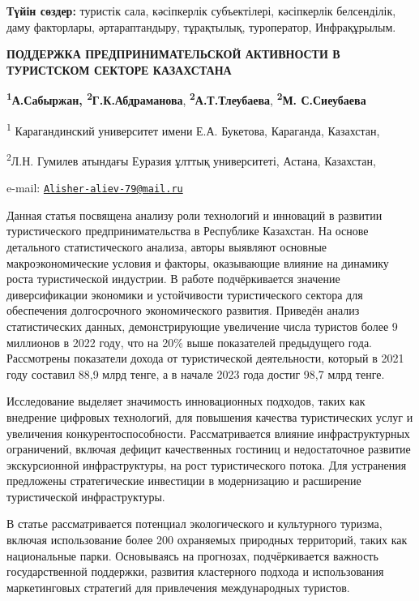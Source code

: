 {\bfseries Түйін сөздер:} туристік сала, кәсіпкерлік субъектілері,
кәсіпкерлік белсенділік, даму факторлары, әртараптандыру, тұрақтылық,
туроператор, Инфрақұрылым.

{\bfseries ПОДДЕРЖКА ПРЕДПРИНИМАТЕЛЬСКОЙ АКТИВНОСТИ В ТУРИСТСКОМ СЕКТОРЕ
КАЗАХСТАНА}

{\bfseries \textsuperscript{1}А.Сабыржан\textsuperscript{\envelope },
\textsuperscript{2}Г.К.Абдраманова},
{\bfseries \textsuperscript{2}А.Т.Тлеубаева}, {\bfseries \textsuperscript{2}М.
С.Сиеубаева}

\textsuperscript{1} Карагандинский университет имени Е.А. Букетова,
Караганда, Казахстан,

\textsuperscript{2}Л.Н. Гумилев атындағы Еуразия ұлттық университеті,
Астана, Казахстан,

e-mail:
\href{mailto:Alisher-aliev-79@mail.ru}{\nolinkurl{Alisher-aliev-79@mail.ru}}

Данная статья посвящена анализу роли технологий и инноваций в развитии
туристического предпринимательства в Республике Казахстан. На основе
детального статистического анализа, авторы выявляют основные
макроэкономические условия и факторы, оказывающие влияние на динамику
роста туристической индустрии. В работе подчёркивается значение
диверсификации экономики и устойчивости туристического сектора для
обеспечения долгосрочного экономического развития. Приведён анализ
статистических данных, демонстрирующие увеличение числа туристов более 9
миллионов в 2022 году, что на 20\% выше показателей предыдущего года.
Рассмотрены показатели дохода от туристической деятельности, который в
2021 году составил 88,9 млрд тенге, а в начале 2023 года достиг 98,7
млрд тенге.

Исследование выделяет значимость инновационных подходов, таких как
внедрение цифровых технологий, для повышения качества туристических
услуг и увеличения конкурентоспособности. Рассматривается влияние
инфраструктурных ограничений, включая дефицит качественных гостиниц и
недостаточное развитие экскурсионной инфраструктуры, на рост
туристического потока. Для устранения предложены стратегические
инвестиции в модернизацию и расширение туристической инфраструктуры.

В статье рассматривается потенциал экологического и культурного туризма,
включая использование более 200 охраняемых природных территорий, таких
как национальные парки. Основываясь на прогнозах, подчёркивается
важность государственной поддержки, развития кластерного подхода и
использования маркетинговых стратегий для привлечения международных
туристов.

